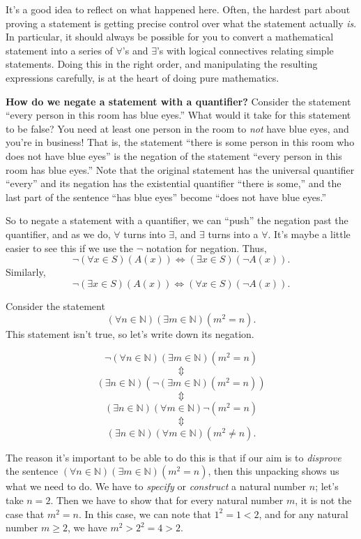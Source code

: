 \documentclass[11pt,dvipsnames]{book}
\numberwithin{figure}{section} %
\numberwithin{table}{section} %
\begin{document}
It's a good idea to reflect on what happened here.
Often, the hardest part about proving a statement is getting precise control over what the statement actually \emph{is}.
In particular, it should always be possible for you to convert a mathematical statement into a series of $\forall$'s and $\exists$'s with logical connectives relating simple statements.
Doing this in the right order, and manipulating the resulting expressions carefully, is at the heart of doing pure mathematics.

\bigskip

{\bf How do we negate a statement with a quantifier?}
Consider the statement ``every person in this room has blue eyes.''
What would it take for this statement to be false?
You need at least one person in the room to \emph{not} have blue eyes, and you're in business!
That is, the statement ``there is some person in this room who does not have blue eyes'' is the negation of the statement ``every person in this room has blue eyes.''
Note that the original statement has the universal quantifier ``every'' and its negation has the existential quantifier ``there is some,'' and the last part of the sentence ``has blue eyes'' become ``does not have blue eyes.''

So to negate a statement with a quantifier, we can ``push'' the negation past the quantifier, and as we do, $\forall$ turns into $\exists$, and $\exists$ turns into a $\forall$.
It's maybe a little easier to see this if we use the $\neg$ notation for negation.
Thus,
\[
    \neg(\forall x \in S)(A(x)) \iff (\exists x \in S)(\neg A(x)).
\]
Similarly,
\[
    \neg(\exists x \in S)(A(x)) \iff (\forall x \in S)(\neg A(x)).
\]

\begin{example}
Consider the statement
\[
    (\forall n \in \mathbb{N})(\exists m \in \mathbb{N})(m^2 = n).
\]
This statement isn't true, so let's write down its negation.
\begin{center}
\[
\neg(\forall n\in\mathbb{N})(\exists m\in\mathbb{N})(m^2=n)
\]
\[\Updownarrow\]
\[
(\exists n\in\mathbb{N})(\neg(\exists m\in\mathbb{N})(m^2=n))
\]
\[\Updownarrow\]
\[
(\exists n\in\mathbb{N})(\forall m\in\mathbb{N})\neg(m^2=n)
\]
\[\Updownarrow\]
\[
(\exists n\in\mathbb{N})(\forall m\in\mathbb{N})(m^2\neq n).
\]
\end{center}

The reason it's important to be able to do this is that if our aim is to \emph{disprove} the sentence $(\forall n \in \mathbb{N})(\exists m \in \mathbb{N})(m^2 = n)$, then this unpacking shows us what we need to do.
We have to \emph{specify} or \emph{construct} a natural number $n$; let's take $n=2$.
Then we have to show that for every natural number $m$, it is not the case that $m^2 = n$.
In this case, we can note that $1^2 = 1 < 2$, and for any natural number $m \geq 2$, we have $m^2 > 2^2 = 4 > 2$.
\end{example}
\end{document}

